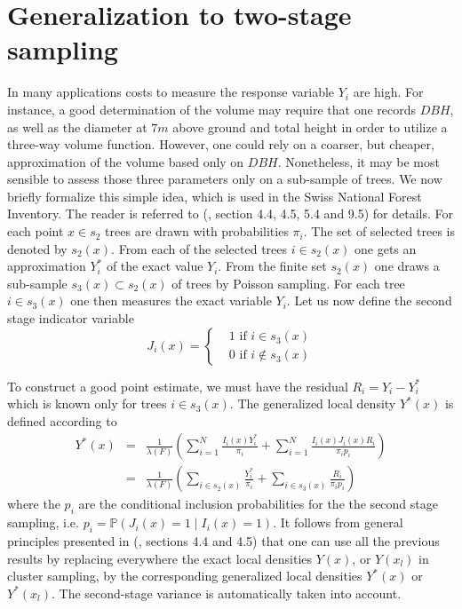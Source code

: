 \documentclass[a4paper,12pt,leqno, titlepage]{article}
\newcommand{\LF}{\ensuremath{\lambda(F)}}
\newcommand{\PR}{\mathbb{P}}
\begin{document}
{{\section{Generalization to two-stage sampling}
In many applications costs to measure the response variable $Y_i$ are high. For instance,
a good determination of the volume may require that one records
$DBH$, as well as the diameter at $7m$ above ground and total height
in order to utilize a three-way volume function. However, one could rely
on a coarser, but cheaper, approximation of the volume based only on
$DBH$. Nonetheless, it may be most sensible to assess those three
parameters only on a sub-sample of trees. We now briefly formalize this
simple idea, which is used in the Swiss National Forest Inventory. The reader is referred to (\cite{mandallaz}, section 4.4, 4.5, 5.4 and 9.5) for details. For each point $x\in{s_2}$ trees are drawn with
probabilities $\pi_i$. The set of selected trees is denoted by
$s_{2}(x)$. From each of the selected trees $i\in{s_{2}(x)}$ one
gets an approximation $Y_i^*$ of the exact value $Y_i$. From the
finite set $s_{2}(x)$ one draws a sub-sample
$s_{3}(x)\subset{s_{2}(x)}$ of trees by Poisson sampling. For each tree $i\in{s_{3}(x)}$
one then measures the exact variable $Y_i$. Let us now define the
second stage indicator variable
\begin{equation}
 J_i(x)=\begin{cases}&1 \text{ if $i\in s_{3}(x)$}\\
                      &0 \text{ if $i\not\in s_{3}(x)$}
         \end{cases}
\end{equation}

 \par To construct a good point estimate, we must have
 the residual $R_i=Y_i-Y_i^*$ which is known only for trees
 $i\in{s_{3}(x)}$. The generalized local density $Y^*(x)$ is defined
 according to    
 \begin{eqnarray}\label{gdens}
 Y^*(x)&=&\frac{1}{\LF}\left( \sum_{i=1}^N \frac{I_{i}(x)Y_i^*}{\pi_i} +
 \sum_{i=1}^N \frac{I_{i}(x)J_{i}(x)R_i}{\pi_{i}p_i}\right)\nonumber \\
 &=&\frac{1}{\LF}\left( \sum_{i\in{s_{2}(x)}} \frac{Y_i^*}{\pi_i}
 +\sum_{i\in{s_{3}(x)}} \frac{R_i}{\pi_{i}p_i}\right)
 \end{eqnarray}
 where the $p_i$ are the conditional inclusion probabilities for the the second stage sampling, i.e. $p_i=\PR(J_i(x)=1 \mid I_i(x)=1)$.
 It follows from general principles presented in (\cite{mandallaz}, sections 4.4 and 4.5) that one can use all the previous results by replacing everywhere the exact local densities $Y(x)$, or $Y(x_l)$ in cluster sampling, by the corresponding generalized local densities $Y^*(x)$ or $Y^*(x_l)$. The second-stage variance is automatically taken into account.

}}
\end{document}
